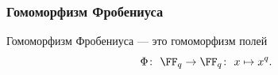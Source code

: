 \subsubsection{Гомоморфизм Фробениуса}

\begin{definition}
	Гомоморфизм Фробениуса --- это гомоморфизм полей
	\[
		\Phi \colon\ 
		\FF_q \to \FF_q
		\colon
		\ 
		x \mapsto x^{q}
		.
	\]
\end{definition}






% 
